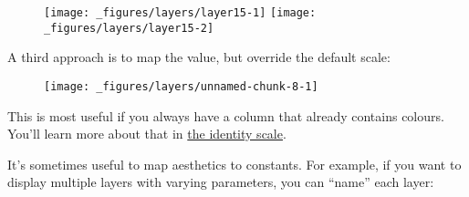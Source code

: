 \begin{Shaded}
\begin{Highlighting}[]
\StringTok{ }
\StringTok{  }\NormalTok{(} \NormalTok{) }

\StringTok{ }
\StringTok{  }\NormalTok{(}\NormalTok{(} \NormalTok{))}
\end{Highlighting}
\end{Shaded}

\begin{figure}[H]
  \texttt{[image: \_figures/layers/layer15-1]}%
  \texttt{[image: \_figures/layers/layer15-2]}
\end{figure}

A third approach is to map the value, but override the default scale:

\begin{Shaded}
\begin{Highlighting}[]
\StringTok{ }
\StringTok{  }\NormalTok{(}\NormalTok{(} \NormalTok{)) +}\StringTok{ }
\StringTok{  }\NormalTok{()}
\end{Highlighting}
\end{Shaded}

\begin{figure}[H]
  \centering
  \texttt{[image: \_figures/layers/unnamed-chunk-8-1]}
\end{figure}

This is most useful if you always have a column that already contains
colours. You'll learn more about that in
\hyperref[sub:scale-identity]{the identity scale}.

It's sometimes useful to map aesthetics to constants. For example, if
you want to display multiple layers with varying parameters, you can
``name'' each layer:

\begin{Shaded}
\begin{Highlighting}[]
\StringTok{ }
\StringTok{  }\NormalTok{() +}
\StringTok{  }\NormalTok{(}\NormalTok{(} \NormalTok{), } \NormalTok{, } \NormalTok{) +}\StringTok{ }
\StringTok{  }\NormalTok{(}\NormalTok{(} \NormalTok{), } \NormalTok{, } \NormalTok{) +}
\StringTok{  }\NormalTok{(} \NormalTok{)}
\end{Highlighting}
\end{Shaded}

